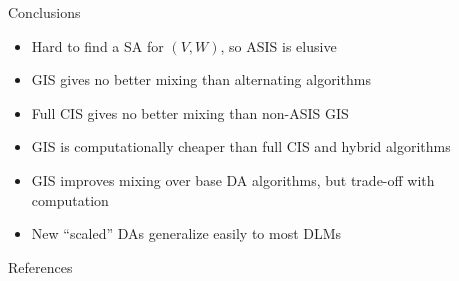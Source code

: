\documentclass[svgnames, final]{beamer}\usepackage{graphicx, color}
\newenvironment{knitrout}{}{} %
\begin{document}
\begin{frame}{}
\begin{columns}
\begin{column}{0.47\textwidth}
      \vfill
\vfill

\begin{block}{\large Conclusions}
  \begin{itemize}
      \footnotesize
  \item Hard to find a SA for $(V,W)$, so ASIS is elusive
  \item GIS gives no better mixing than alternating algorithms
  \item Full CIS gives no better mixing than non-ASIS GIS
  \item GIS is computationally cheaper than full CIS and hybrid algorithms
  \item GIS improves mixing over base DA algorithms, but trade-off with computation
  \item New ``scaled'' DAs generalize easily to most DLMs
  \end{itemize}
\end{block}

\vfill
\begin{block}{\large References}
  {\footnotesize
    \nocite{*} %
  }
  
\end{block}
\vfill
\end{column}
\end{columns}
    
\end{frame}
\end{document}
